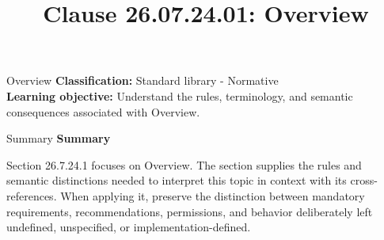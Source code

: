 \documentclass[10pt,letterpaper]{article}
\title{Clause 26.07.24.01: Overview}
\author{}
\date{}
\begin{document}
\maketitle
\begin{CornellOverviewBox}{Overview}
\textbf{Classification:} Standard library - Normative\\[2pt]
\textbf{Learning objective:} Understand the rules, terminology, and semantic consequences associated with Overview.
\end{CornellOverviewBox}\begin{CornellSummaryBox}{Summary}
{\sffamily\bfseries\color{Accent} Summary}\par\vspace{3pt}Section 26.7.24.1 focuses on Overview. The section supplies the rules and semantic distinctions needed to interpret this topic in context with its cross-references. When applying it, preserve the distinction between mandatory requirements, recommendations, permissions, and behavior deliberately left undefined, unspecified, or implementation-defined.
\end{CornellSummaryBox}
\end{document}

